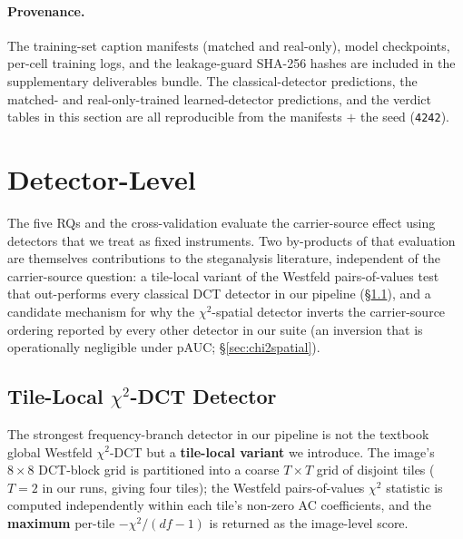 \documentclass[10pt,twocolumn,a4paper]{article}
\DeclareRobustCommand{\by}[1]{\textnormal{\normalfont\footnotesize\space--- #1}}
\begin{document}
\paragraph{Provenance.} The training-set caption manifests (matched and real-only), model checkpoints, per-cell training logs, and the leakage-guard SHA-256 hashes are included in the supplementary deliverables bundle. The classical-detector predictions, the matched- and real-only-trained learned-detector predictions, and the verdict tables in this section are all reproducible from the manifests $+$ the seed (\texttt{4242}).

\section[Detector-Level Contributions\by{\textbf{Writer:} Daria Gjonbalaj \textbf{Reviewer:} Nico \textbf{Contributor:}  Nikolas}]{Detector-Level}
\label{sec:detector-side}


The five RQs and the cross-validation evaluate the carrier-source effect using detectors that we treat as fixed instruments.  Two by-products of that evaluation are themselves contributions to the steganalysis literature, independent of the carrier-source question: a tile-local variant of the Westfeld pairs-of-values test that out-performs every classical DCT detector in our pipeline (\S\ref{sec:tiled}), and a candidate mechanism for why the $\chi^2$-spatial detector inverts the carrier-source ordering reported by every other detector in our suite (an inversion that is operationally negligible under pAUC; \S\ref{sec:chi2spatial}).

\subsection{Tile-Local $\chi^2$-DCT Detector}
\label{sec:tiled}

The strongest frequency-branch detector in our pipeline is not the textbook global Westfeld $\chi^2$-DCT but a \textbf{tile-local variant} we introduce. The image's $8\!\times\!8$ DCT-block grid is partitioned into a coarse $T\!\times\!T$ grid of disjoint tiles ($T\!=\!2$ in our runs, giving four tiles); the Westfeld pairs-of-values $\chi^2$ statistic is computed independently within each tile's non-zero AC coefficients, and the \textbf{maximum} per-tile $-\chi^2/(df\!-\!1)$ is returned as the image-level score.
\end{document}
